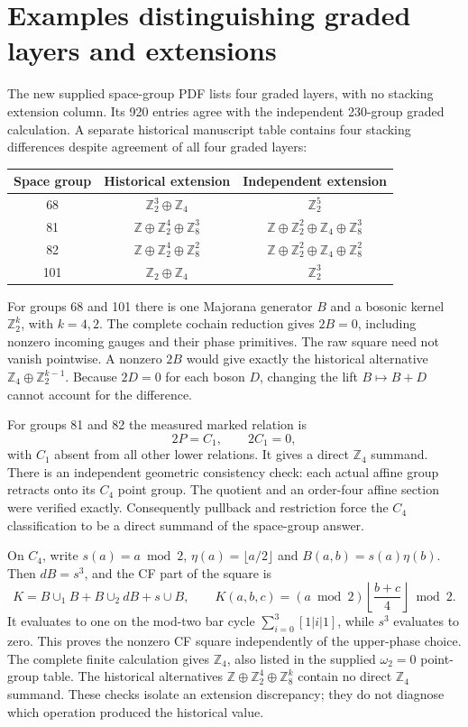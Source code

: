 \documentclass[11pt]{article}
\begin{document}
\section{Examples distinguishing graded layers and extensions}
The new supplied space-group PDF lists four graded layers, with no stacking
extension column. Its 920 entries agree with the independent 230-group
graded calculation. A separate historical manuscript table contains four
stacking differences despite agreement of all four graded layers:
\begin{center}
\begin{tabular}{c|c|c}
 Space group & Historical extension & Independent extension\\\hline
 68 & $\mathbb Z_2^3\oplus\mathbb Z_4$ & $\mathbb Z_2^5$\\
 81 & $\mathbb Z\oplus\mathbb Z_2^4\oplus\mathbb Z_8^3$
    & $\mathbb Z\oplus\mathbb Z_2^2\oplus\mathbb Z_4\oplus\mathbb Z_8^3$\\
 82 & $\mathbb Z\oplus\mathbb Z_2^4\oplus\mathbb Z_8^2$
    & $\mathbb Z\oplus\mathbb Z_2^2\oplus\mathbb Z_4\oplus\mathbb Z_8^2$\\
 101 & $\mathbb Z_2\oplus\mathbb Z_4$ & $\mathbb Z_2^3$
\end{tabular}
\end{center}
For groups 68 and 101 there is one Majorana generator $B$ and a bosonic
kernel $\mathbb Z_2^k$, with $k=4,2$. The complete cochain reduction gives
$2B=0$, including nonzero incoming gauges and their phase primitives.
The raw square need not vanish pointwise. A nonzero $2B$ would give exactly
the historical alternative $\mathbb Z_4\oplus\mathbb Z_2^{k-1}$.
Because $2D=0$ for each boson $D$, changing the lift $B\mapsto B+D$
cannot account for the difference.

For groups 81 and 82 the measured marked relation is
\begin{equation}
 2P=C_1,\qquad 2C_1=0,
\end{equation}
with $C_1$ absent from all other lower relations. It gives a direct
$\mathbb Z_4$ summand. There is an independent geometric consistency
check: each actual affine group retracts onto its $C_4$ point group.
The quotient and an order-four affine section were verified exactly.
Consequently pullback and restriction force the $C_4$ classification to
be a direct summand of the space-group answer.

On $C_4$, write $s(a)=a\bmod2$, $\eta(a)=\lfloor a/2\rfloor$ and
$B(a,b)=s(a)\eta(b)$. Then $dB=s^3$, and the CF part of the square is
\begin{equation}
 K=B\cup_1B+B\cup_2dB+s\cup B,
 \qquad K(a,b,c)=(a\bmod2)\left\lfloor\frac{b+c}{4}\right\rfloor\bmod2.
\end{equation}
It evaluates to one on the mod-two bar cycle
$\sum_{i=0}^3[1|i|1]$, while $s^3$ evaluates to zero. This proves the
nonzero CF square independently of the upper-phase choice. The complete
finite calculation gives $\mathbb Z_4$, also listed in the supplied
$\omega_2=0$ point-group table. The historical alternatives
$\mathbb Z\oplus\mathbb Z_2^4\oplus\mathbb Z_8^k$ contain no direct
$\mathbb Z_4$ summand. These checks isolate an extension discrepancy;
they do not diagnose which operation produced the historical value.
\end{document}
